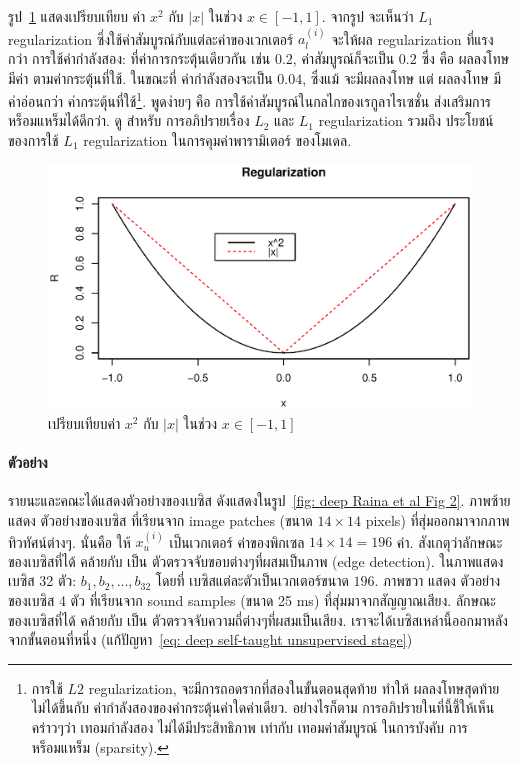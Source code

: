 รูป~\ref{fig: deep L1 L2 Norm} แสดงเปรียบเทียบ ค่า $x^2$ กับ $|x|$ ในช่วง $x \in [-1,1]$.
จากรูป จะเห็นว่า $L_1$ regularization ซึ่งใช้ค่าสัมบูรณ์กับแต่ละค่าของเวกเตอร์ $a_l^{(i)}$ จะให้ผล regularization ที่แรงกว่า การใช้ค่ากำลังสอง:
ที่ค่าการกระตุ้นเดียวกัน เช่น $0.2$, ค่าสัมบูรณ์ก็จะเป็น $0.2$ ซึ่ง คือ ผลลงโทษมีค่า ตามค่ากระตุ้นที่ใช้.
ในขณะที่ ค่ากำลังสองจะเป็น $0.04$, ซึ่งแม้ จะมีผลลงโทษ แต่ ผลลงโทษ มีค่าอ่อนกว่า ค่ากระตุ้นที่ใช้\footnote{
การใช้ $L2$ regularization, จะมีการถอดรากที่สองในขั้นตอนสุดท้าย ทำให้ ผลลงโทษสุดท้าย ไม่ได้ขึ้นกับ ค่ากำลังสองของค่ากระตุ้นค่าใดค่าเดียว.
อย่างไรก็ตาม การอภิปรายในที่นี้ชี้ให้เห็นคร่าวๆว่า เทอมกำลังสอง ไม่ได้มีประสิทธิภาพ เท่ากับ เทอมค่าสัมบูรณ์ ในการบังคับ การหร็อมแหร็ม (sparsity).
}.
พูดง่ายๆ คือ การใช้ค่าสัมบูรณ์ในกลไกของเรกูลาไรเซชั่น ส่งเสริมการหร็อมแหร็มได้ดีกว่า.
%
ดู \cite{Ng2004a} สำหรับ การอภิปรายเรื่อง $L_2$ และ $L_1$ regularization รวมถึง ประโยชน์ของการใช้ $L_1$ regularization ในการคุมค่าพารามิเตอร์ ของโมเดล.

%
\begin{figure}
\begin{center}
\includegraphics[width=6in]{04SelfTaught/L1L2Norm.eps}
\end{center}
\caption{เปรียบเทียบค่า $x^2$ กับ $|x|$ ในช่วง $x \in [-1,1]$}
\label{fig: deep L1 L2 Norm}
\end{figure}
%

\paragraph{ตัวอย่าง}
รายนะและคณะได้แสดงตัวอย่างของเบซิส ดังแสดงในรูป~\ref{fig: deep Raina et al Fig 2}.
ภาพซ้าย แสดง ตัวอย่างของเบซิส ที่เรียนจาก image patches (ขนาด $14 \times 14$ pixels) ที่สุ่มออกมาจากภาพทิวทัศน์ต่างๆ.
นั่นคือ ให้ $x_u^{(i)}$ เป็นเวกเตอร์ ค่าของพิกเซล $14 \times 14 = 196$ ค่า.
สังเกตุว่าลักษณะของเบซิสที่ได้ คล้ายกับ เป็น ตัวตรวจจับขอบต่างๆที่ผสมเป็นภาพ (edge detection).
ในภาพแสดง เบซิส 32 ตัว: $b_1, b_2, \ldots, b_{32}$ โดยที่ เบซิสแต่ละตัวเป็นเวกเตอร์ขนาด $196$.
ภาพขวา แสดง ตัวอย่างของเบซิส 4 ตัว ที่เรียนจาก sound samples (ขนาด 25 ms) ที่สุ่มมาจากสัญญาณเสียง.
ลักษณะของเบซิสที่ได้ คล้ายกับ เป็น ตัวตรวจจับความถี่ต่างๆที่ผสมเป็นเสียง.
เราจะได้เบซิสเหล่านี้ออกมาหลังจากขั้นตอนที่หนึ่ง (แก้ปัญหา~\ref{eq: deep self-taught unsupervised stage})

